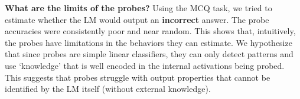 \textbf{What are the limits of the probes?} Using the MCQ task, we tried to estimate whether the LM would output an \textbf{incorrect} answer. The probe accuracies were consistently poor and near random. This shows that, intuitively, the probes have limitations in the behaviors they can estimate. We hypothesize that since probes are simple linear classifiers, they can only detect patterns and use `knowledge' that is well encoded in the internal activations being probed. This suggests that probes struggle with output properties that cannot be identified by the LM itself (without external knowledge). %